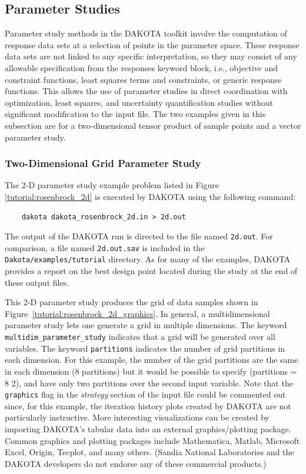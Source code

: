 \subsection{Parameter Studies}\label{tutorial:example:param_study}

Parameter study methods in the DAKOTA toolkit involve the computation 
of response data sets at a selection of points in the parameter space. 
These response data sets are not linked to any specific interpretation,
so they may consist of any allowable specification from the responses 
keyword block, i.e., objective and constraint functions, least squares 
terms and constraints, or generic response functions. This allows the 
use of parameter studies in direct coordination with optimization, least 
squares, and uncertainty quantification studies without significant
modification to the input file.  
The two examples given in this subsection are for a two-dimensional 
tensor product of sample points and a vector parameter study.

\subsubsection{Two-Dimensional Grid Parameter Study}\label{tutorial:example:param_study:two}

The 2-D parameter study example problem listed in Figure~
\ref{tutorial:rosenbrock_2d} is executed by DAKOTA using the
following command:
\begin{small}
\begin{verbatim}
    dakota dakota_rosenbrock_2d.in > 2d.out
\end{verbatim}
\end{small}

The output of the DAKOTA run is directed to the file named
\texttt{2d.out}. For comparison, a file named \texttt{2d.out.sav} is
included in the \texttt{Dakota/examples/tutorial} directory. As
for many of the examples, DAKOTA provides a report on the best design
point located during the study at the end of these output files.

This 2-D parameter study produces the grid of data samples shown in
Figure~\ref{tutorial:rosenbrock_2d_graphics}. In general, a multidimensional 
parameter study lets one generate a grid in multiple dimensions. 
The keyword \texttt{multidim\_parameter\_study} indicates that 
a grid will be generated over all variables.  The keyword 
\texttt{partitions} indicates the number of grid partitions in 
each dimension. For this example, the number of the grid partitions 
are the same in each dimension (8 partitions) but it would be possible 
to specify (partitions = 8 2), and have only two partitions 
over the second input variable.   Note that the
\texttt{graphics} flag in the \emph{strategy} section of the input
file could be commented out since, for this example, the iteration
history plots created by DAKOTA are not particularly instructive. More
interesting visualizations can be created by importing DAKOTA's
tabular data into an external graphics/plotting package. Common
graphics and plotting packages include Mathematica, Matlab, Microsoft
Excel, Origin, Tecplot, and many others. (Sandia National Laboratories
and the DAKOTA developers do not endorse any of these commercial
products.)

